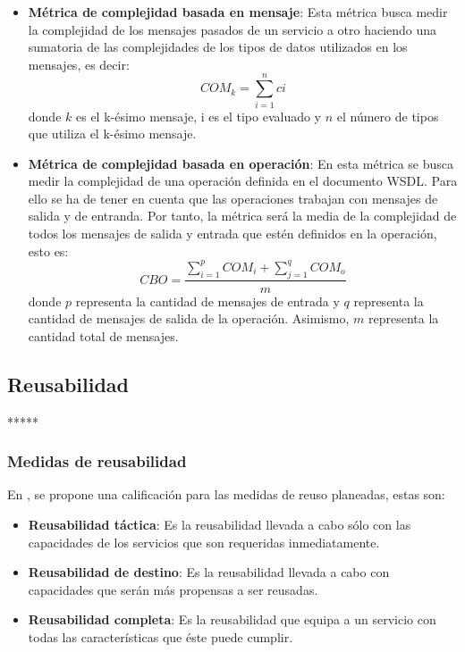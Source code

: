 \begin{itemize}

 \item \textbf{Métrica de complejidad basada en mensaje}: Esta métrica busca medir la complejidad de los mensajes pasados de un servicio a otro haciendo una sumatoria de las complejidades de los tipos de datos utilizados en los mensajes, es decir: $$COM_{k} = \sum_{i=1}^{n} ci$$ donde $k$ es el k-ésimo mensaje, i es el tipo evaluado y $n$ el número de tipos que utiliza el k-ésimo mensaje.
 \item \textbf{Métrica de complejidad basada en operación}: En esta métrica se busca medir la complejidad de una operación definida en el documento WSDL. Para ello se ha de tener en cuenta que las operaciones trabajan con mensajes de salida y de entranda. Por tanto, la métrica será la media de la complejidad de todos los mensajes de salida y entrada que estén definidos en la operación, esto es: $$CBO = \frac{\sum_{i=1}^{p} COM_{i} + \sum_{j=1}^{q} COM_{o}}{m}$$ donde $p$ representa la cantidad de mensajes de entrada y $q$ representa la cantidad de mensajes de salida de la operación. Asimismo, $m$ representa la cantidad total de mensajes.

\end{itemize}

\subsection{Reusabilidad}

*****

\subsubsection{Medidas de reusabilidad}

 En \cite{soa_principles}, se propone una calificación para las medidas de reuso planeadas, estas son:

\begin{itemize}
 \item \textbf{Reusabilidad táctica}: Es la reusabilidad llevada a cabo sólo con las capacidades de los servicios que son requeridas inmediatamente.
 \item \textbf{Reusabilidad de destino}: Es la reusabilidad llevada a cabo con capacidades que serán más propensas a ser reusadas.
 \item \textbf{Reusabilidad completa}: Es la reusabilidad que equipa a un servicio con todas las características que éste puede cumplir.
\end{itemize}

